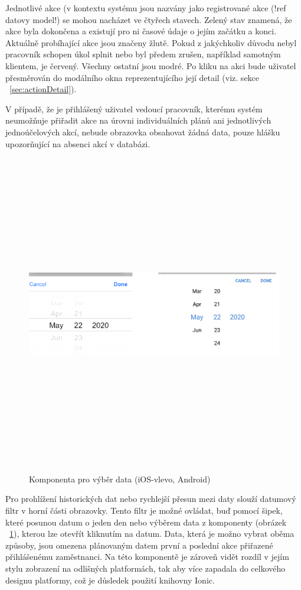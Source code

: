 \documentclass[
  glossaries,
]{kidiplom}
\begin{document}
Jednotlivé akce (v kontextu systému jsou nazvány jako registrované akce (!ref datovy model!) se mohou nacházet ve čtyřech stavech. Zelený stav znamená, že akce byla dokončena a existují pro ni časové údaje o jejím začátku a konci. Aktuálně probíhající akce jsou značeny žlutě. Pokud z jakýchkoliv důvodu nebyl pracovník schopen úkol splnit nebo byl předem zrušen, například samotným klientem, je červený. Všechny ostatní jsou modré. Po kliku na akci bude uživatel přesměrován do modálního okna reprezentujícího její detail (viz. sekce ~\ref{sec:actionDetail}).

V případě, že je přihlášený uživatel vedoucí pracovník, kterému systém neumožňuje přiřadit akce na úrovni individuálních plánů ani jednotlivých jednoúčelových akcí, nebude obrazovka obsahovat žádná data, pouze hlášku upozorňující na absenci akcí v databázi.

\begin{figure}[H]
  	\centering
 	 \includegraphics[width=14cm,height=14cm,keepaspectratio]{datepicker}
 	 \caption{Komponenta pro výběr data (iOS-vlevo, Android)}
 	 \label{fig:datepicker}
\end{figure}

Pro prohlížení historických dat nebo rychlejší přesun mezi daty slouží datumový filtr v horní části obrazovky. Tento filtr je možné ovládat, buď pomocí šipek, které posunou datum o jeden den nebo výběrem data z komponenty (obrázek ~\ref{fig:datepicker}), kterou lze otevřít kliknutím na datum. Data, která je možno vybrat oběma způsoby, jsou omezena plánovaným datem první a poslední akce přiřazené přihlášenému zaměstnanci. Na této komponentě je zároveň vidět rozdíl v jejím stylu zobrazení na odlišných platformách, tak aby více zapadala do celkového designu platformy, což je důsledek použití knihovny Ionic.
\end{document}
